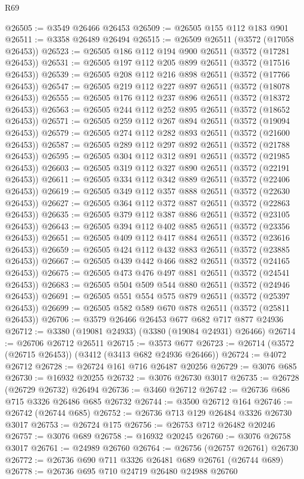 \begin{lexlean}{R69}
\begin{coremodule}
@26505 := @3549 @26466 @26453
@26509 := @26505 @155 @112 @183 @901
@26511 := @3358 @26489 @26494
@26515 := @26509 @26511 (@3572 (@17058 @26453))
@26523 := @26505 @186 @112 @194 @900 @26511 (@3572 (@17281 @26453))
@26531 := @26505 @197 @112 @205 @899 @26511 (@3572 (@17516 @26453))
@26539 := @26505 @208 @112 @216 @898 @26511 (@3572 (@17766 @26453))
@26547 := @26505 @219 @112 @227 @897 @26511 (@3572 (@18078 @26453))
@26555 := @26505 @176 @112 @237 @896 @26511 (@3572 (@18372 @26453))
@26563 := @26505 @244 @112 @252 @895 @26511 (@3572 (@18652 @26453))
@26571 := @26505 @259 @112 @267 @894 @26511 (@3572 (@19094 @26453))
@26579 := @26505 @274 @112 @282 @893 @26511 (@3572 (@21600 @26453))
@26587 := @26505 @289 @112 @297 @892 @26511 (@3572 (@21788 @26453))
@26595 := @26505 @304 @112 @312 @891 @26511 (@3572 (@21985 @26453))
@26603 := @26505 @319 @112 @327 @890 @26511 (@3572 (@22191 @26453))
@26611 := @26505 @334 @112 @342 @889 @26511 (@3572 (@22406 @26453))
@26619 := @26505 @349 @112 @357 @888 @26511 (@3572 (@22630 @26453))
@26627 := @26505 @364 @112 @372 @887 @26511 (@3572 (@22863 @26453))
@26635 := @26505 @379 @112 @387 @886 @26511 (@3572 (@23105 @26453))
@26643 := @26505 @394 @112 @402 @885 @26511 (@3572 (@23356 @26453))
@26651 := @26505 @409 @112 @417 @884 @26511 (@3572 (@23616 @26453))
@26659 := @26505 @424 @112 @432 @883 @26511 (@3572 (@23885 @26453))
@26667 := @26505 @439 @442 @466 @882 @26511 (@3572 (@24165 @26453))
@26675 := @26505 @473 @476 @497 @881 @26511 (@3572 (@24541 @26453))
@26683 := @26505 @504 @509 @544 @880 @26511 (@3572 (@24946 @26453))
@26691 := @26505 @551 @554 @575 @879 @26511 (@3572 (@25397 @26453))
@26699 := @26505 @582 @589 @670 @878 @26511 (@3572 (@25811 @26453))
@26706 := @3579 @26466 @26453 @677 @682 @717 @877 @24936
@26712 := @3380 (@19081 @24933) (@3380 (@19084 @24931) @26466)
@26714 := @26706 @26712 @26511
@26715 := @3573 @677
@26723 := @26714 (@3572 (@26715 @26453)) (@3412 (@3413 @682 @24936 @26466))
@26724 := @4072 @26712
@26728 := @26724 @161 @716 @26487 @20256
@26729 := @3076 @685
@26730 := @16932 @20255
@26732 := @3076 @26730 @3017
@26735 := @26728 (@26729 @26732) @26494
@26736 := @3460 @26712
@26742 := @26736 @686 @715 @3326 @26486 @685 @26732
@26744 := @3500 @26712 @164
@26746 := @26742 (@26744 @685)
@26752 := @26736 @713 @129 @26484 @3326 @26730 @3017
@26753 := @26724 @175
@26756 := @26753 @712 @26482 @20246
@26757 := @3076 @689
@26758 := @16932 @20245
@26760 := @3076 @26758 @3017
@26761 := @24989 @26760
@26764 := @26756 (@26757 @26761) @26730
@26772 := @26736 @690 @711 @3326 @26481 @689 @26761 (@26744 @689)
@26778 := @26736 @695 @710 @24719 @26480 @24988 @26760

\end{coremodule}
\end{lexlean}
